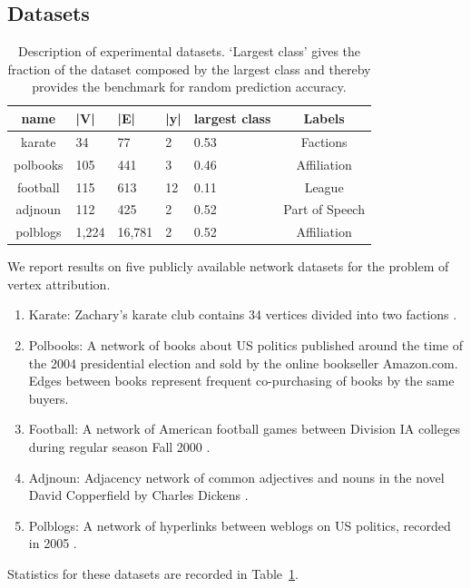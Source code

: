 \documentclass[sigconf, review]{acmart}
\begin{document}
\subsection{Datasets}
\begin{table}[tb]
  \centering
  \caption{Description of experimental datasets. `Largest class' gives the fraction of the dataset composed by the largest class and thereby provides the benchmark for random prediction accuracy.}
    \begin{tabular}{cllllc}
    \toprule
    name & |V| & |E| & |y| & largest class & Labels  \\
    \midrule
    karate     & 34 & 77 & 2 & 0.53 & Factions \\
    polbooks & 105 & 441 & 3 & 0.46 & Affiliation \\
    football & 115 & 613 & 12 & 0.11 & League \\
    adjnoun & 112 & 425 & 2 & 0.52 & Part of Speech \\
    polblogs & 1,224 & 16,781 & 2 & 0.52 & Affiliation \\
    \bottomrule
    \end{tabular}%
  \label{tab:datasets}%
\end{table}%
We report results on five publicly available network datasets for the problem of vertex attribution.
\begin{enumerate}
\item Karate: Zachary's karate club contains 34 vertices divided into two factions \cite{Zachary1977}.
\item Polbooks: A network of books about US politics published around the time of the 2004 presidential election and sold by the online bookseller Amazon.com. Edges between books represent frequent co-purchasing of books by the same buyers. 
\item Football: A network of American football games between Division IA colleges during regular season Fall 2000 \cite{Girvan2002}.
\item Adjnoun: Adjacency network of common adjectives and nouns in the novel David Copperfield by Charles Dickens \cite{Newman2006}.
\item Polblogs: A network of hyperlinks between weblogs on US politics, recorded in 2005 \cite{Adamic2005}.
\end{enumerate}
Statistics for these datasets are recorded in Table~\ref{tab:datasets}.
\end{document}
